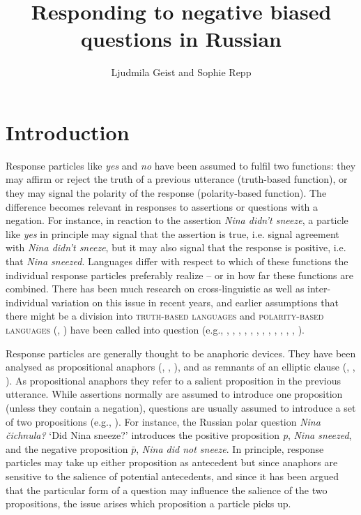 \documentclass[output=paper,colorlinks,citecolor=brown]{langscibook}
\author{Ljudmila Geist\orcid{0000-0001-7907-4958}\affiliation{University of Stuttgart} and Sophie Repp\orcid{0000-0003-1575-4553}\affiliation{University of Cologne}}
\title{Responding to negative biased questions in Russian}
\begin{document}
\maketitle

\section{Introduction}\label{geist-repp:sec:intro}

\sloppy Response particles like \textit{yes} and \textit{no} have been assumed to fulfil two functions: they may affirm or reject the truth of a previous utterance (truth-based function), or they may signal the polarity of the response (polarity-based function). The difference becomes relevant in responses to assertions or questions with a negation. For instance, in reaction to the assertion \textit{Nina didn’t sneeze}, a particle like \textit{yes} in principle may signal that the assertion is true, i.e. signal agreement with \textit{Nina didn't sneeze}, but it may also signal that the response is positive, i.e. that \textit{Nina sneezed}. Languages differ with respect to which of these functions the individual response particles preferably realize -- or in how far these functions are combined. There has been much research on cross-linguistic as well as inter-individual variation on this issue in recent years, and earlier assumptions that there might be a division into \textsc{truth-based languages} and \textsc{polarity-based languages} (\citealt{Pope1976}, \citealt{Jones1999}) have been called into question (e.g., \citealt{Krifka2013}, \citealt{GoodhueWagner2018}, \citealt{Gonzalez-FuenteTubauEspinalPrieto2015}, \citealt{KramerRawlins2011}, \citealt{Holmberg2013}, \citeyear{Holmberg2015}, \citealt{MeijerClausReppKrifka2015}, \citealt{RoelofsenFarkas2015}, \citealt{LiGonzalez-FuenteEspinal2016}, \citealt{ClausMeijerReppKrifka2017}, \citealt{FarkasRoelofsen2019}, \citealt{ReppMeijerScherf2019}, \citealt{LoosSteinbachRepp2020}).

Response particles are generally thought to be anaphoric devices. They have been analysed as propositional anaphors (\citealt{Krifka2013}, \citealt{RoelofsenFarkas2015}, \citealt{FarkasRoelofsen2019}), and as remnants of an elliptic clause (\citealt{KramerRawlins2011}, \citealt{Holmberg2013}, \citeyear{Holmberg2015}). As propositional anaphors they refer to a salient proposition in the previous utterance. While assertions normally are assumed to introduce one proposition (unless they contain a negation), questions are usually assumed to introduce a set of two propositions (e.g., \citealt{Hamblin1973}). For instance, the Russian polar question \textit{Nina čichnula?} ‘Did Nina sneeze?’ introduces the positive proposition \textit{p}, \textit{Nina sneezed}, and the negative proposition $\bar{p}$, \textit{Nina did not sneeze}. In principle, response particles may take up either proposition as antecedent but since anaphors are sensitive to the salience of potential antecedents, and since it has been argued that the particular form of a question may influence the salience of the two propositions, the issue arises which proposition a particle picks up. 
\end{document}
